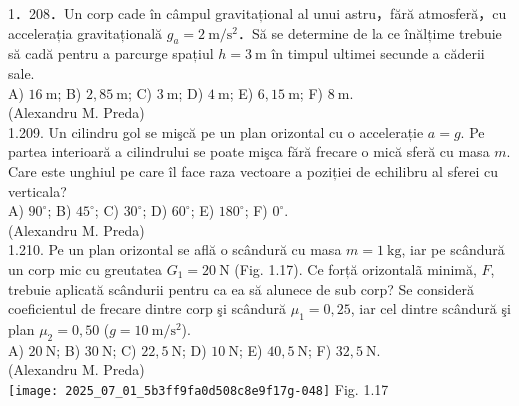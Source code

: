 1．208．Un corp cade în câmpul gravitațional al unui astru，fără atmosferă，cu accelerația gravitațională $g_{a}=2 \mathrm{~m} / \mathrm{s}^{2}$．Să se determine de la ce înălțime trebuie să cadă pentru a parcurge spațiul $h=3 \mathrm{~m}$ în timpul ultimei secunde a căderii sale.\\ A) $16 \mathrm{~m}$; B) $2,85 \mathrm{~m}$; C) $3 \mathrm{~m}$; D) $4 \mathrm{~m}$; E) $6,15 \mathrm{~m}$; F) $8 \mathrm{~m}$.\\ (Alexandru M. Preda)\\

1.209. Un cilindru gol se mişcă pe un plan orizontal cu o accelerație $a=g$. Pe partea interioară a cilindrului se poate mişca fără frecare o mică sferă cu masa $m$. Care este unghiul pe care îl face raza vectoare a poziției de echilibru al sferei cu verticala?\\ A) $90^{\circ}$; B) $45^{\circ}$; C) $30^{\circ}$; D) $60^{\circ}$; E) $180^{\circ}$; F) $0^{\circ}$.\\ (Alexandru M. Preda)\\

1.210. Pe un plan orizontal se află o scândură cu masa $m=1 \mathrm{~kg}$, iar pe scândură un corp mic cu greutatea $G_{1}=20 \mathrm{~N}$ (Fig. 1.17). Ce forță orizontalã minimă, $F$, trebuie aplicată scândurii pentru ca ea să alunece de sub corp? Se consideră coeficientul de frecare dintre corp şi scândură $\mu_{1}=0,25$, iar cel dintre scândură şi plan $\mu_{2}=0,50$ ($g=10 \mathrm{~m} / \mathrm{s}^{2}$).\\ A) $20 \mathrm{~N}$; B) $30 \mathrm{~N}$; C) $22,5 \mathrm{~N}$; D) $10 \mathrm{~N}$; E) $40,5 \mathrm{~N}$; F) $32,5 \mathrm{~N}$.\\ (Alexandru M. Preda)\\ \texttt{[image: 2025\_07\_01\_5b3ff9fa0d508c8e9f17g-048]} Fig. 1.17\\

